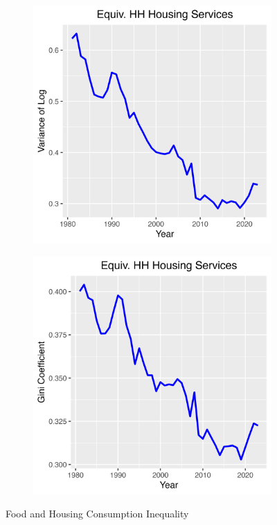 \documentclass{article}
\begin{document}
\begin{figure}
\begin{subfigure}[t]{0.475\textwidth}
        \label{fig:Food_Gini}
    \end{subfigure}
    \begin{subfigure}[t]{0.475\textwidth}
        \centering
        \includegraphics[width=\textwidth]{figures/Fig_8/Fig_8c_Var_Housing.png}
        \label{fig:Housing_Var}
    \end{subfigure}
    \begin{subfigure}[t]{0.475\textwidth}
        \centering
        \includegraphics[width=\textwidth]{figures/Fig_8/Fig_8d_Gini_Housing.png}
        \label{fig:Housing_Gini}
    \end{subfigure}
    \caption{Food and Housing Consumption Inequality}
    \label{fig:Food_Housing}
\end{figure}
\end{document}
